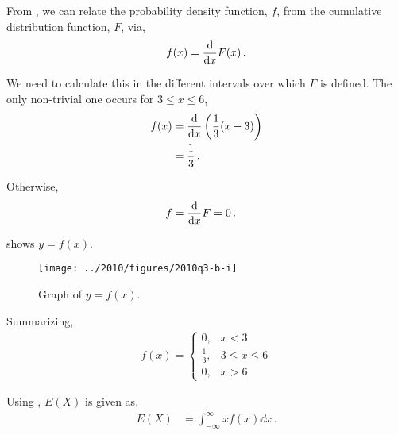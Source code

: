 \begin{subquestions}
	
\subquestion

\begin{subsubquestions}
	
\subsubquestion

From , we can relate the probability density function, $f$, from the cumulative distribution function, $F$, via,
\begin{equation}
	f(x) = \frac{\mathrm{d}}{\mathrm{d}x}F(x) \,.
\end{equation}

We need to calculate this in the different intervals over which $F$ is defined. The only non-trivial one occurs for $3\leq x \leq 6$,
\begin{align}
	f(x) & = \frac{\mathrm{d}}{\mathrm{d}x}\left(\frac{1}{3}(x-3) \right) \nonumber \\
	     & = \frac{1}{3} \,.
\end{align}

Otherwise,
\begin{align}
	f &= \frac{\mathrm{d}}{\mathrm{d}x} F = 0\,.
\end{align}

 shows $y=f(x)$.
\begin{figure}[H]
	\begin{center}
		\texttt{[image: ../2010/figures/2010q3-b-i]}
		\caption{\label{2010:q3:fig:fGraph} Graph of $y=f(x)$.}
	\end{center}
\end{figure}

Summarizing,
\begin{align}
	f(x) =\begin{cases} 
	0, & x < 3 \\
	\frac{1}{3}, & 3 \leq x \leq 6 \\
	0, & x > 6 
		\end{cases}
\end{align}


\subsubquestion

Using , $E(X)$ is given as,
\begin{align}
	E(X) & = \int_{-\infty}^{\infty}x f(x)\dd x \,.
\end{align}


\end{subsubquestions}
\end{subquestions}
